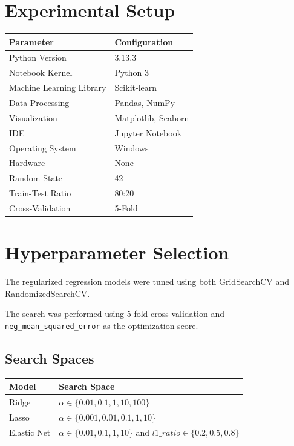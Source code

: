 \documentclass[12pt,a4paper]{article}
\begin{document}

\section{Experimental Setup}

\begin{tabular}{ll}
\toprule
\textbf{Parameter} & \textbf{Configuration} \\
\midrule
Python Version & 3.13.3 \\
Notebook Kernel & Python 3 \\
Machine Learning Library & Scikit-learn \\
Data Processing & Pandas, NumPy \\
Visualization & Matplotlib, Seaborn \\
IDE & Jupyter Notebook \\
Operating System & Windows \\
Hardware & None \\
Random State & 42 \\
Train-Test Ratio & 80:20 \\
Cross-Validation & 5-Fold \\
\bottomrule
\end{tabular}

\vspace{0.4cm}


\section{Hyperparameter Selection}

The regularized regression models were tuned using both GridSearchCV and
RandomizedSearchCV.

The search was performed using 5-fold cross-validation and
\texttt{neg\_mean\_squared\_error} as the optimization score.

\subsection{Search Spaces}

\begin{longtable}{|p{4cm}|p{8cm}|}
\hline
\textbf{Model} & \textbf{Search Space} \\ \hline

Ridge &
$\alpha \in \{0.01,0.1,1,10,100\}$ \\ \hline

Lasso &
$\alpha \in \{0.001,0.01,0.1,1,10\}$ \\ \hline

Elastic Net &
$\alpha \in \{0.01,0.1,1,10\}$ and
$l1\_ratio \in \{0.2,0.5,0.8\}$ \\ \hline

\end{longtable}
\end{document}

